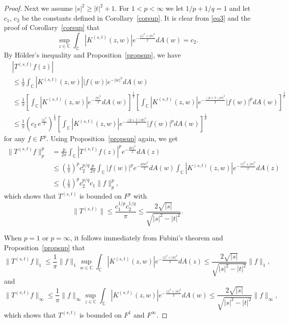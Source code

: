 \documentclass[reqno]{amsart}
\newcommand{\C}{{\mathbb C}}
\newcommand{\inc}{\int_{\C}}
\begin{document}
\begin{proof}
Next we assume $|s|^2\ge|t|^2+1$. For $1< p< \infty$ we let
$1/p+1/q=1$ and let $c_1$, $c_2$ be the constants defined in
Corollary~\ref{corsup}. It is clear from \eqref{eq3} and the proof of
Corollary~\ref{corsup} that
$$\sup_{z\in\C}\inc\left|K^{(s,t)}(z,w)\right|
e^{-\frac{|z|^2+|w|^2}{2}}dA(w)=c_2.$$
By H\"{o}lder's inequality and Proposition~\ref{propsup}, we have
\begin{align*}
&\left|T^{(s,t)}f(z)\right|\\
&\leq\frac{1}{\pi}\inc\left|K^{(s,t)}(z,w)\right||f(w)|e^{-|w|^2}dA(w)\\
&\leq\frac{1}{\pi}\left[\inc\left|K^{(s,t)}(z,w)\right|
e^{-\frac{|w|^2}{2}}dA(w)\right]^{\frac{1}{q}}
\left[\inc\left|K^{(s,t)}(z,w)\right|e^{-\frac{(p+1)|w|^2}{2}}
|f(w)|^pdA(w)\right]^{\frac{1}{p}}\\
&\leq\frac{1}{\pi}\left(c_2 \,e^{\frac{|z|^2}{2}}\right)^{\frac{1}{q}}
\left[\inc\left|K^{(s,t)}(z,w)\right|e^{-\frac{(p+1)|w|^2}{2}}|f(w)|^p
dA(w)\right]^{\frac{1}{p}}
\end{align*}
for any $f\in F^p$. Using Proposition~\ref{propsup} again, we get
\begin{align*}
\|T^{(s, t)}f\|_p^p&=\frac{p}{2\pi}\inc\left|T^{(s,t)}f(z)\right|^p
e^{-\frac{p|z|^2}{2}}dA(z)\\[8pt]
&\leq\left(\frac{1}{\pi}\right)^pc_2^{p/q}\frac{p}{2\pi}
\inc|f(w)|^pe^{-\frac{p|w|^2}{2}}dA(w)
\inc \left|K^{(s,t)}(z,w)\right|e^{-\frac{|z|^2+|w|^2}{2}}dA(z)\\[8pt]
&\leq \left(\frac{1}{\pi}\right)^pc_2^{p/q}c_1\|f\|_p^p,
\end{align*}
which shows that $T^{(s, t)}$ is bounded on $F^p$ with
$$ \|T^{(s, t)}\|\leq \frac{c_1^{1/p}c_2^{1/q}}{\pi}
\leq \frac{2\sqrt{|s|}}{\sqrt{|s|^2-|t|^2}}.$$

When $p=1$ or $p=\infty$, it follows immediately from Fubini's
theorem and Proposition~\ref{propsup} that
$$\|T^{(s, t)}f\|_1\leq \frac{1}{\pi}\|f\|_{1}\sup_{w\in\C}
\inc\left|K^{(s,t)}(z,w)\right|e^{-\frac{|z|^2+|w|^2}{2}}dA(z)
\leq \frac{2\sqrt{|s|}}{\sqrt{|s|^2-|t|^2}}\|f\|_1,$$
and
$$\|T^{(s, t)}f\|_{\infty}\leq\frac{1}{\pi}\|f\|_{\infty}
\sup_{z\in\C}\inc\left|K^{({s},t)}(z,w)\right|
e^{-\frac{|z|^2+|w|^2}{2}}dA(w)
\leq \frac{2\sqrt{|s|}}{\sqrt{|s|^2-|t|^2}}\|f\|_{\infty},$$
which shows that $T^{(s,t)}$ is bounded on $F^1$ and $F^\infty$.


\end{proof}
\end{document}
